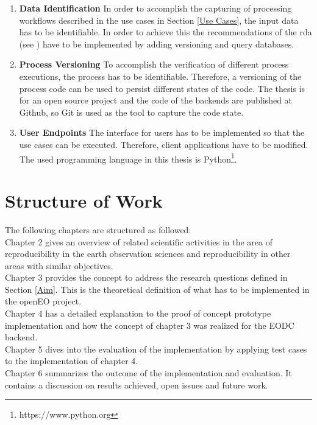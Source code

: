 \documentclass[draft,final]{vutinfth} %
\begin{document}
\begin{enumerate}
	\item \textbf{Data Identification}
	In order to accomplish the capturing of processing workflows described in the use cases in Section \ref{Use Cases}, the input data has to be identifiable. In order to achieve this the recommendations of the \gls{rda} (see \cite{rauber2016identification}) have to be implemented by adding versioning and query databases. 
	
	\item \textbf{Process Versioning}
	To accomplish the verification of different process executions, the process has to be identifiable. Therefore, a versioning of the process code can be used to persist different states of the code. The thesis is for an open source project and the code of the backends are published at Github, so Git is used as the tool to capture the code state. 
		
	\item \textbf{User Endpoints}
	The interface for users has to be implemented so that the use cases can be executed. Therefore, client applications have to be modified. The used programming language in this thesis is Python\footnote{https://www.python.org}.
\end{enumerate}

\section{Structure of Work}\label{Structure}
The following chapters are structured as followed:\\
Chapter 2 gives an overview of related scientific activities in the area of reproducibility in the earth observation sciences and reproducibility in other areas with similar objectives. \\
Chapter 3 provides the concept to address the research questions defined in Section \ref{Aim}.  This is the theoretical definition of what has to be implemented in the openEO project.\\
Chapter 4 has a detailed explanation to the proof of concept prototype implementation and how the concept of chapter 3 was realized for the EODC backend. \\
Chapter 5 dives into the evaluation of the implementation by applying test cases to the implementation of chapter 4.\\
Chapter 6 summarizes the outcome of the implementation and evaluation. It contains a discussion on results achieved, open issues and future work. \\
\end{document}
